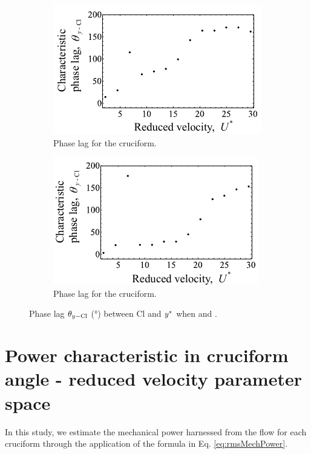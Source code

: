 \documentclass[oneside]{utmthesis}
\begin{document}
\begin{figure}
  \centering
  \begin{subfigure}[h]{0.4\textwidth}
    \includegraphics[width=\textwidth]{figs/phaseLag2}
    \caption{Phase lag for the \angtw{} cruciform.}
    \label{fig:phaseLag225deg}
  \end{subfigure}
  \hspace{6mm}
  \begin{subfigure}[h]{0.4\textwidth}
    \includegraphics[width=\textwidth]{figs/phaseLag1}
    \caption{Phase lag for the \angon{} cruciform.}
    \label{fig:phaseLag00deg}
  \end{subfigure}

  \caption{Phase lag $\theta_{y-\text{Cl}}$ (\si{\degree}) between Cl and $y^{*}$ when \angtw{} and \angon{}.}
  \label{fig:phaseLag22500deg}
\end{figure}

\chapter{Power characteristic in cruciform angle - reduced velocity parameter space}\label{chap:powerCharacteristic}
In this study, we estimate the mechanical power harnessed from the flow for each cruciform through the application of the formula in Eq. \ref{eq:rmsMechPower}.
\end{document}
